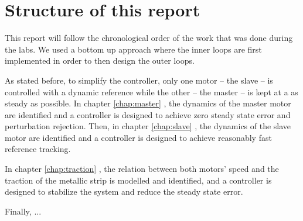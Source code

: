 \section{Structure of this report}
This report will follow the chronological order of the work that was done during the labs. We used a bottom up approach where the inner loops are first implemented in order to then design the outer loops.

As stated before, to simplify the controller, only one motor -- the slave -- is controlled with a dynamic reference while the other -- the master -- is kept at a as steady as possible. In chapter \ref{chap:master} , the dynamics of the master motor are identified and a controller is designed to achieve zero steady state error and perturbation rejection. Then, in chapter \ref{chap:slave} , the dynamics of the slave motor are identified and a controller is designed to achieve reasonably fast reference tracking.

In chapter \ref{chap:traction} , the relation between both motors' speed and the traction of the metallic strip is modelled and identified, and a controller is designed to stabilize the system and reduce the steady state error.

Finally, ... 




